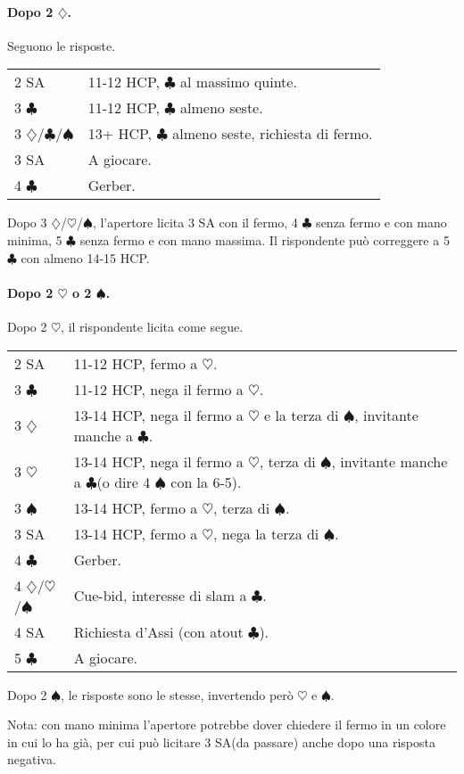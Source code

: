 \documentclass[a4paper,10pt]{article}
\renewcommand{\c}{$\clubsuit$\xspace}
\renewcommand{\d}{$\diamondsuit$\xspace}
\newcommand{\h}{$\heartsuit$\xspace}
\newcommand{\s}{$\spadesuit$\xspace}
\newcommand{\sa}{SA\xspace}
\newcommand{\smallspace}{\vskip0.3cm}
\newenvironment{twocol}
  {\smallspace\noindent\begin{tabular}{l p{0.78\textwidth}}}
  {\end{tabular}\smallspace}
\begin{document}
\paragraph{Dopo 2 \d.}

Seguono le risposte.

\begin{twocol}
	2 \sa & 11-12 HCP, \c al massimo quinte. \\
	3 \c & 11-12 HCP, \c almeno seste. \\
	3 \d/\c/\s & 13+ HCP, \c almeno seste, richiesta di fermo. \\
	3 \sa & A giocare. \\
	4 \c & Gerber.
\end{twocol}

Dopo 3 \d/\h/\s, l'apertore licita 3 \sa con il fermo, 4 \c senza fermo e con mano minima, 5 \c senza fermo e con mano massima. Il rispondente può correggere a 5 \c con almeno 14-15 HCP.

\paragraph{Dopo 2 \h o 2 \s.}

Dopo 2 \h, il rispondente licita come segue.

\begin{twocol}
	2 \sa & 11-12 HCP, fermo a \h. \\
	3 \c & 11-12 HCP, nega il fermo a \h. \\
	3 \d & 13-14 HCP, nega il fermo a \h e la terza di \s, invitante manche a \c. \\
	3 \h & 13-14 HCP, nega il fermo a \h, terza di \s, invitante manche a \c (o dire 4 \s con la 6-5). \\
	3 \s & 13-14 HCP, fermo a \h, terza di \s. \\
	3 \sa & 13-14 HCP, fermo a \h, nega la terza di \s. \\
	4 \c & Gerber. \\
	4 \d/\h/\s & Cue-bid, interesse di slam a \c. \\
	4 \sa & Richiesta d'Assi (con atout \c). \\
	5 \c & A giocare. \\
\end{twocol}

Dopo 2 \s, le risposte sono le stesse, invertendo però \h e \s.

Nota: con mano minima l'apertore potrebbe dover chiedere il fermo in un colore in cui lo ha già, per cui può licitare 3 \sa (da passare) anche dopo una risposta negativa.
\end{document}
